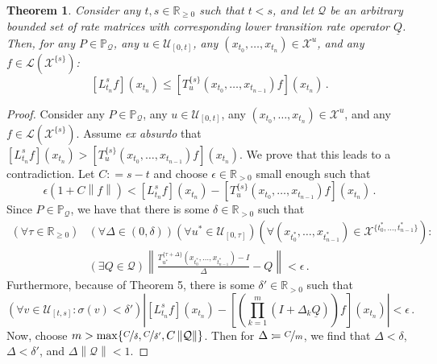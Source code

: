 \documentclass[10pt]{paper}
\newtheorem{theorem}{Theorem}
\newcommand{\reals}{\mathbb{R}}
\newcommand{\realspos}{\reals_{>0}}
\newcommand{\realsnonneg}{\reals_{\geq 0}}
\newcommand{\states}{\mathcal{X}}
\newcommand{\gambles}{\mathcal{L}}
\newcommand{\lrate}{\underline{Q}}
\newcommand{\norm}[1]{\left\lVert #1 \right\rVert}
\newcommand{\coloneqq}{:\!=}
\begin{document}
\begin{theorem}\label{theorem:nonmarkov_single_var_lower_bounded}
Consider any $t,s\in\realsnonneg$ such that $t<s$, and let $\mathcal{Q}$ be an arbitrary bounded set of rate matrices with corresponding lower transition rate operator $\lrate$. Then, for any $P\in\mathbb{P}_{\mathcal{Q}}$, any $u\in\mathcal{U}_{[0,t]}$, any $(x_{t_0},\ldots,x_{t_n})\in\states^u$, and any $f\in\gambles(\states^{\{s\}})$:
\begin{equation*}
\left[L_{t_n}^s f\right](x_{t_n}) \leq \left[T_u^{\{s\}}(x_{t_0},\ldots,x_{t_{n-1}})f\right](x_{t_n})\,.
\end{equation*}
\end{theorem}
\begin{proof}
Consider any $P\in\mathbb{P}_{\mathcal{Q}}$, any $u\in\mathcal{U}_{[0,t]}$, any $(x_{t_0},\ldots,x_{t_n})\in\states^u$, and any $f\in\gambles(\states^{\{s\}})$. Assume \emph{ex absurdo} that $\left[L_{t_n}^sf\right](x_{t_n}) > \left[T_u^{\{s\}}(x_{t_0},\ldots,x_{t_{n-1}})f\right](x_{t_n})$. We prove that this leads to a contradiction. Let $C\coloneqq s-t$ and choose $\epsilon\in\realspos$ small enough such that
\begin{equation}
\epsilon(1 + C\norm{f}) < \left[L_{t_n}^sf\right](x_{t_n}) - \left[T_u^{\{s\}}(x_{t_0},\ldots,x_{t_{n-1}})f\right](x_{t_n})\,.
\end{equation}
Since $P\in\mathbb{P}_\mathcal{Q}$, we have that there is some $\delta\in\realspos$ such that
\begin{align}
(\forall \tau\in\realsnonneg)&(\forall\Delta\in(0,\delta))(\forall u^*\in\mathcal{U}_{[0,\tau]})(\forall (x_{t_0^*},\ldots,x_{t_{n-1}^*})\in\states^{\{t_0^*,\ldots,t_{n-1}^*\}}): \\
&(\exists Q\in\mathcal{Q}) \norm{\frac{T_{u^*}^{\{\tau+\Delta\}}(x_{t_0^*},\ldots,x_{t_{n-1}^*}) - I}{\Delta} - Q} < \epsilon\,.\label{eq:nonmarkov_rate_exists}
\end{align}
Furthermore, because of Theorem 5, there is some $\delta'\in\realspos$ such that
\begin{equation}
(\forall v\in\mathcal{U}_{[t,s]} : \sigma(v) < \delta') \left\vert \left[L_{t_n}^s f\right](x_{t_n}) - \left[\left(\prod_{k=1}^m(I + \Delta_k\lrate)\right)f\right](x_{t_n})\right\vert < \epsilon\,.\label{eq:nonmarkov_lower_exists}
\end{equation}
Now, choose $m > \max\{\nicefrac{C}{\delta}, \nicefrac{C}{\delta'},C\norm{\mathcal{Q}} \}$. Then for $\Delta\coloneqq\nicefrac{C}{m}$, we find that $\Delta<\delta$, $\Delta<\delta'$, and $\Delta\norm{\mathcal{Q}}<1$.


\end{proof}
\end{document}
